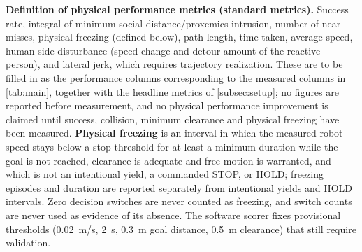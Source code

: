 \noindent\textbf{Definition of physical performance metrics (standard metrics).} Success rate, integral of minimum social distance/proxemics intrusion, number of near-misses, physical freezing (defined below), path length, time taken, average speed, human-side disturbance (speed change and detour amount of the reactive person), and lateral jerk, which requires trajectory realization. These are to be filled in as the performance columns corresponding to the measured columns in \cref{tab:main}, together with the headline metrics of \cref{subsec:setup}; no figures are reported before measurement, and no physical performance improvement is claimed until success, collision, minimum clearance and physical freezing have been measured. \textbf{Physical freezing} is an interval in which the measured robot speed stays below a stop threshold for at least a minimum duration while the goal is not reached, clearance is adequate and free motion is warranted, and which is not an intentional yield, a commanded STOP, or HOLD; freezing episodes and duration are reported separately from intentional yields and HOLD intervals. Zero decision switches are never counted as freezing, and switch counts are never used as evidence of its absence. The software scorer  fixes provisional thresholds (0.02~m/s, 2~s, 0.3~m goal distance, 0.5~m clearance) that still require validation.

